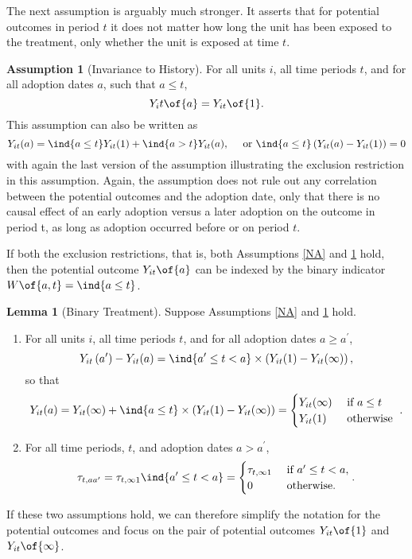 \documentclass[12pt]{article}
\theoremstyle{definition}
\newtheorem{assumption}{Assumption}
\newtheorem{lemma}[theorem]{Lemma}
\begin{document}
The next assumption is arguably much stronger. It asserts that for potential outcomes in period $t$ it does not matter how long the unit has been exposed to the treatment, only whether the unit is exposed at time $t$.

\begin{assumption}[Invariance to History] \label{IH}
    For all units $i$, all time periods $t$, and for all adoption dates $a$, such that $a \leq t$,
    $$
    Y_it\of{a} = Y_{it}\of{1}.
    $$
    This assumption can also be written as 
    $$
    Y_{i t}(a)=\ind{a \leq t} Y_{i t}(1)+\ind{a>t} Y_{i t}(a), \quad \text { or } \ind{a \leq t}\left(Y_{i t}(a)-Y_{i t}(1)\right)=0
    $$
    with again the last version of the assumption illustrating the exclusion restriction in this assumption. Again, the assumption does not rule out any correlation between the potential outcomes and the adoption date, only that there is no causal effect of an early adoption versus a later adoption on the outcome in period t, as long as adoption occurred before or on period $t$.
\end{assumption}

If both the exclusion restrictions, that is, both Assumptions \ref{NA} and \ref{IH} hold, then the potential outcome $Y_{it}\of{a}$ can be indexed by the binary indicator $W\of{a,t} = \ind{a \leq t}$.

\begin{lemma}[Binary Treatment] \label{lemma2}
    Suppose Assumptions \ref{NA} and \ref{IH} hold. 
    \begin{enumerate}[topsep=0pt, leftmargin=20pt, itemsep=0pt, label=(\arabic*)]
        \setlength{\parskip}{10pt} 
        \item For all units $i$, all time periods $t$, and for all adoption dates $a \geq a^\prime$, 
        $$
        Y_{i t}\left(a^{\prime}\right)-Y_{i t}(a)=\ind{a^{\prime} \leq t<a} \times \left(Y_{i t}(1)-Y_{i t}(\infty)\right),
        $$
        so that 
        $$
        Y_{i t}(a)=Y_{i t}(\infty)+\ind{a \leq t} \times \left(Y_{i t}(1)-Y_{i t}(\infty)\right)= \begin{cases}Y_{i t}(\infty) & \text { if } a \leq t \\ Y_{i t}(1) & \text { otherwise }\end{cases}.
        $$

        \item For all time periods, $t$, and adoption dates $a > a^\prime$, 
        $$
        \tau_{t, a a^{\prime}}=\tau_{t, \infty 1} \ind{a^{\prime} \leq t<a}= \begin{cases}\tau_{t, \infty 1} & \text { if } a^{\prime} \leq t<a, \\ 0 & \text { otherwise. }\end{cases}.
        $$
    \end{enumerate}
\end{lemma}
If these two assumptions hold, we can therefore simplify the notation for the potential outcomes and focus on the pair of potential outcomes $Y_{it}\of{1}$ and $Y_{it}\of{\infty}$.
\end{document}
